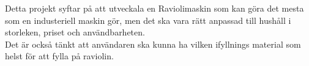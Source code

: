 Detta projekt syftar på att utveckala en Raviolimaskin som kan göra det mesta som en industeriell maskin gör, men det ska vara rätt anpassad till hushåll i storleken, priset och användbarheten. \\

Det är också tänkt att användaren ska kunna ha vilken ifyllnings material som helst för att fylla på raviolin.



